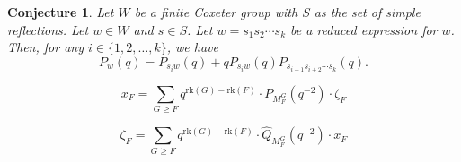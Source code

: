 \documentclass[10pt]{article}
\newtheorem{conjecture}[theorem]{Conjecture}
\theoremstyle{remark}
\begin{document}
\begin{conjecture}
    Let $W$ be a finite Coxeter group with $S$ as the set of simple reflections. Let $w \in W$ and $s \in S$. Let $w = s_1s_2\cdots s_k$ be a reduced expression for $w$. Then, for any $i \in \{1,2,\ldots,k\}$, we have
    \begin{equation}
        P_{w}(q) = P_{s_iw}(q) + qP_{s_iw}(q)P_{s_{i+1}s_{i+2}\cdots s_k}(q).
    \end{equation}
    \end{conjecture}

\begin{equation}
    x_F = \sum_{G\geq F}{q^{\text{rk}(G) - \text{rk}(F)}\cdot P_{M^G_F}(q^{-2})\cdot \zeta_F}
\end{equation}

\begin{equation}
    \zeta_F = \sum_{G\geq F}{q^{\text{rk}(G) - \text{rk}(F)}\cdot \hat{Q}_{M^G_F}(q^{-2})\cdot x_F}
\end{equation}
\end{document}
